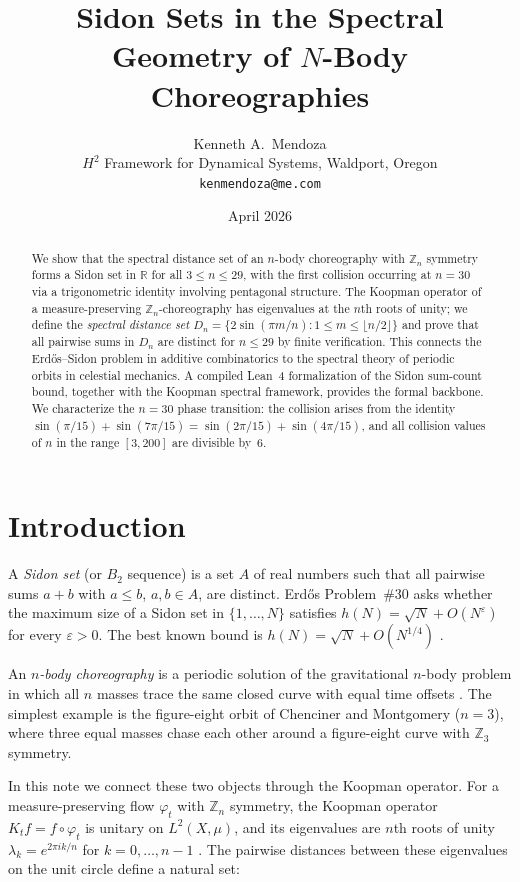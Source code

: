 \documentclass[11pt]{article}
\title{Sidon Sets in the Spectral Geometry of $N$-Body Choreographies}
\author{Kenneth A.\ Mendoza\\
\small $H^2$ Framework for Dynamical Systems, Waldport, Oregon\\
\small \texttt{kenmendoza@me.com}}
\date{April 2026}
\theoremstyle{definition}
\theoremstyle{remark}
\begin{document}
\maketitle

\begin{abstract}
We show that the spectral distance set of an $n$-body choreography with $\mathbb{Z}_n$ symmetry forms a Sidon set in $\mathbb{R}$ for all $3 \leq n \leq 29$, with the first collision occurring at $n = 30$ via a trigonometric identity involving pentagonal structure. The Koopman operator of a measure-preserving $\mathbb{Z}_n$-choreography has eigenvalues at the $n$th roots of unity; we define the \emph{spectral distance set} $D_n = \{2\sin(\pi m/n) : 1 \leq m \leq \lfloor n/2 \rfloor\}$ and prove that all pairwise sums in $D_n$ are distinct for $n \leq 29$ by finite verification. This connects the Erd\H{o}s--Sidon problem in additive combinatorics to the spectral theory of periodic orbits in celestial mechanics. A compiled Lean~4 formalization of the Sidon sum-count bound, together with the Koopman spectral framework, provides the formal backbone. We characterize the $n = 30$ phase transition: the collision arises from the identity $\sin(\pi/15) + \sin(7\pi/15) = \sin(2\pi/15) + \sin(4\pi/15)$, and all collision values of $n$ in the range $[3, 200]$ are divisible by~6.
\end{abstract}

\section{Introduction}

A \emph{Sidon set} (or $B_2$ sequence) is a set $A$ of real numbers such that all pairwise sums $a + b$ with $a \leq b$, $a, b \in A$, are distinct. Erd\H{o}s Problem~\#30 \cite{erdos30} asks whether the maximum size of a Sidon set in $\{1, \ldots, N\}$ satisfies $h(N) = \sqrt{N} + O(N^\varepsilon)$ for every $\varepsilon > 0$. The best known bound is $h(N) = \sqrt{N} + O(N^{1/4})$ \cite{cilleruelo2010, lindstrom1969}.

An \emph{$n$-body choreography} is a periodic solution of the gravitational $n$-body problem in which all $n$ masses trace the same closed curve with equal time offsets \cite{chenciner2000}. The simplest example is the figure-eight orbit of Chenciner and Montgomery ($n = 3$), where three equal masses chase each other around a figure-eight curve with $\mathbb{Z}_3$ symmetry.

In this note we connect these two objects through the Koopman operator. For a measure-preserving flow $\varphi_t$ with $\mathbb{Z}_n$ symmetry, the Koopman operator $K_t f = f \circ \varphi_t$ is unitary on $L^2(X, \mu)$, and its eigenvalues are $n$th roots of unity $\lambda_k = e^{2\pi i k/n}$ for $k = 0, \ldots, n-1$ \cite{halmos1942}. The pairwise distances between these eigenvalues on the unit circle define a natural set:
\end{document}

